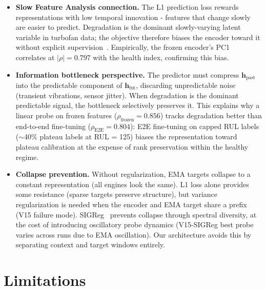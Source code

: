 \documentclass{article}
\newcommand{\h}{\mathbf{h}}
\begin{document}
\begin{itemize}[nosep]
  \item \textbf{Slow Feature Analysis connection.} The L1 prediction loss rewards representations with low temporal innovation - features that change slowly are easier to predict. Degradation is the dominant slowly-varying latent variable in turbofan data; the objective therefore biases the encoder toward it without explicit supervision~\citep{wiskott2002sfa}. Empirically, the frozen encoder's PC1 correlates at $|\rho| = 0.797$ with the health index, confirming this bias.
  \item \textbf{Information bottleneck perspective.} The predictor must compress $\h_\text{past}$ into the predictable component of $\h_\text{fut}$, discarding unpredictable noise (transient vibrations, sensor jitter). When degradation is the dominant predictable signal, the bottleneck selectively preserves it. This explains why a linear probe on frozen features ($\rho_\text{frozen} = 0.856$) tracks degradation better than end-to-end fine-tuning ($\rho_\text{E2E} = 0.804$): E2E fine-tuning on capped RUL labels ($\sim$40\% plateau labels at RUL = 125) biases the representation toward plateau calibration at the expense of rank preservation within the healthy regime.
  \item \textbf{Collapse prevention.} Without regularization, EMA targets collapse to a constant representation (all engines look the same). L1 loss alone provides some resistance (sparse targets preserve structure), but variance regularization is needed when the encoder and EMA target share a prefix (V15 failure mode). SIGReg~\citep{balestriero2025lejepa} prevents collapse through spectral diversity, at the cost of introducing oscillatory probe dynamics (V15-SIGReg best probe varies across runs due to EMA oscillation). Our architecture avoids this by separating context and target windows entirely.
\end{itemize}

\section{Limitations}
\label{sec:limitations}
\end{document}
